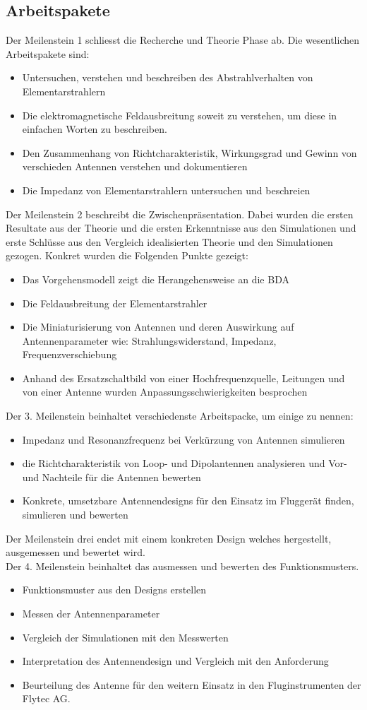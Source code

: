 \subsection{Arbeitspakete}
Der Meilenstein 1 schliesst die Recherche und Theorie Phase ab. Die wesentlichen Arbeitspakete sind:
\begin{itemize}
\item Untersuchen, verstehen und beschreiben des Abstrahlverhalten von Elementarstrahlern
\item Die elektromagnetische Feldausbreitung soweit zu verstehen, um diese in einfachen Worten zu beschreiben.
\item Den Zusammenhang von Richtcharakteristik, Wirkungsgrad und Gewinn von verschieden Antennen verstehen und dokumentieren
\item Die Impedanz von Elementarstrahlern untersuchen und beschreien
\end{itemize}
Der Meilenstein 2 beschreibt die Zwischenpräsentation. Dabei wurden die ersten Resultate aus der Theorie und die ersten Erkenntnisse aus den Simulationen und erste Schlüsse aus den Vergleich idealisierten Theorie und den Simulationen gezogen. 
Konkret wurden die Folgenden Punkte gezeigt:
\begin{itemize}
\item Das Vorgehensmodell zeigt die Herangehensweise an die BDA
\item Die Feldausbreitung der Elementarstrahler
\item Die Miniaturisierung von Antennen und deren Auswirkung auf Antennenparameter wie: Strahlungswiderstand, Impedanz, Frequenzverschiebung
\item Anhand des Ersatzschaltbild von einer Hochfrequenzquelle, Leitungen und von einer Antenne wurden Anpassungsschwierigkeiten besprochen
\end{itemize}
Der 3. Meilenstein beinhaltet verschiedenste Arbeitspacke, um einige zu nennen:
\begin{itemize}
\item Impedanz und Resonanzfrequenz  bei Verkürzung von Antennen simulieren
\item die Richtcharakteristik von Loop- und Dipolantennen analysieren und Vor- und Nachteile für die Antennen bewerten
\item Konkrete, umsetzbare Antennendesigns für den Einsatz im Fluggerät finden, simulieren und bewerten
\end{itemize}
Der Meilenstein drei endet mit einem konkreten Design welches hergestellt, ausgemessen und bewertet wird.\\
Der 4. Meilenstein beinhaltet das ausmessen und bewerten des Funktionsmusters.
\begin{itemize}
\item Funktionsmuster aus den Designs erstellen
\item Messen der Antennenparameter
\item Vergleich der Simulationen mit den Messwerten
\item Interpretation des Antennendesign und Vergleich mit den Anforderung 
\item Beurteilung des Antenne für den weitern Einsatz in den Fluginstrumenten der Flytec AG. 
\end{itemize}

